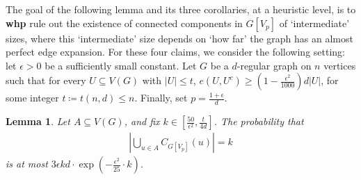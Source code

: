 \documentclass[notitlepage]{scrartcl}
\newtheorem{lemma}[thm]{Lemma}
\begin{document}
The goal of the following lemma and its three corollaries, at a heuristic level, is to \textbf{whp} rule out the existence of connected components in $G[V_p]$ of `intermediate' sizes, where this `intermediate' size depends on `how far' the graph has an almost perfect edge expansion. For these four claims, we consider the following setting: let $\epsilon>0$ be a sufficiently small constant. Let $G$ be a $d$-regular graph on $n$ vertices such that for every $U\subseteq V(G)$ with $|U|\le t$, $e(U,U^c)\ge \left(1-\frac{\epsilon^2}{1000}\right)d|U|$, for some integer $t\coloneqq t(n,d)\le n$. Finally, set $p=\frac{1+\epsilon}{d}$.

\begin{lemma}\label{nsc_general_general}
    Let $A\subseteq V(G)$, and fix $k\in \left[\frac{50}{\epsilon^2}, \frac{t}{4d}\right]$. The probability that
    \begin{align*}
        \left|\bigcup_{u\in A} C_{G[V_p]}(u)\right|=k
    \end{align*}
    is at most $3\epsilon kd\cdot \exp\left(-\frac{\epsilon^2}{25}\cdot k\right)$.
\end{lemma}
\end{document}
